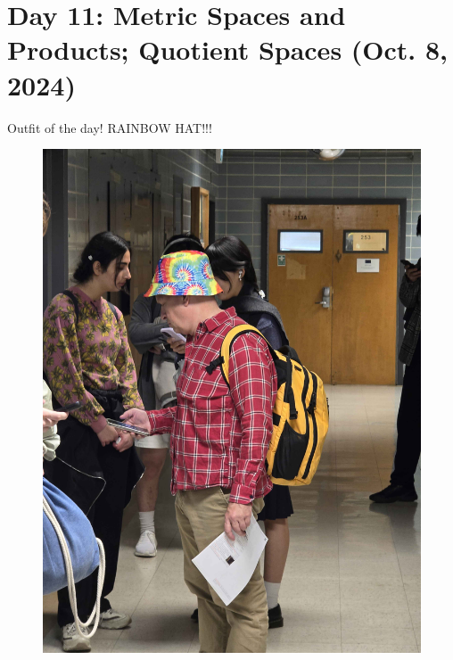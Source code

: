 \section{Day 11: Metric Spaces and Products; Quotient Spaces (Oct. 8, 2024)}
Outfit of the day! RAINBOW HAT!!!
\begin{figure}[h]
    \centering
    \includegraphics[scale=0.1]{MAT327 Notes/Dror Shirts/dror day 11 shirt.jpg}
\end{figure}

